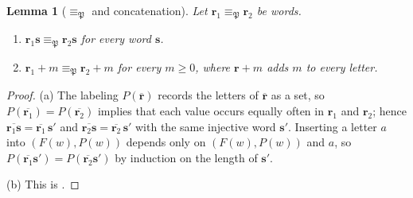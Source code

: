 \documentclass{amsart}
\newtheorem{lemma}{Lemma}[subsection]
\theoremstyle{definition}
\theoremstyle{remark}
\numberwithin{equation}{subsection}
\newcommand{\forest}{\mathfrak{P}}
\begin{document}
\begin{lemma}[$\equiv_\forest$ and concatenation]\label{lemma:forestconcat}
Let $\mathbf r_1\equiv_\forest\mathbf r_2$ be words.
\begin{enumerate}
\item[(a)] $\mathbf r_1\mathbf s\equiv_\forest\mathbf r_2\mathbf s$ for every word $\mathbf s$.
\item[(b)] $\mathbf r_1+m\equiv_\forest\mathbf r_2+m$ for every $m\geq0$, where $\mathbf r+m$ adds $m$ to every letter.
\end{enumerate}
\end{lemma}
\begin{proof}
(a) The labeling $P(\overline{\mathbf r})$ records the letters of $\overline{\mathbf r}$ as a set, so $P(\overline{\mathbf r_1})=P(\overline{\mathbf r_2})$ implies that each value occurs equally often in $\mathbf r_1$ and $\mathbf r_2$; hence $\overline{\mathbf r_1\mathbf s}=\overline{\mathbf r_1}\,\mathbf s'$ and $\overline{\mathbf r_2\mathbf s}=\overline{\mathbf r_2}\,\mathbf s'$ with the same injective word $\mathbf s'$. Inserting a letter $a$ into $(F(w),P(w))$ depends only on $(F(w),P(w))$ and $a$, so $P(\overline{\mathbf r_1}\mathbf s')=P(\overline{\mathbf r_2}\mathbf s')$ by induction on the length of $\mathbf s'$.

(b) This is \cite[Proposition~5.8]{nadeau2024forest}.
\end{proof}
\end{document}

